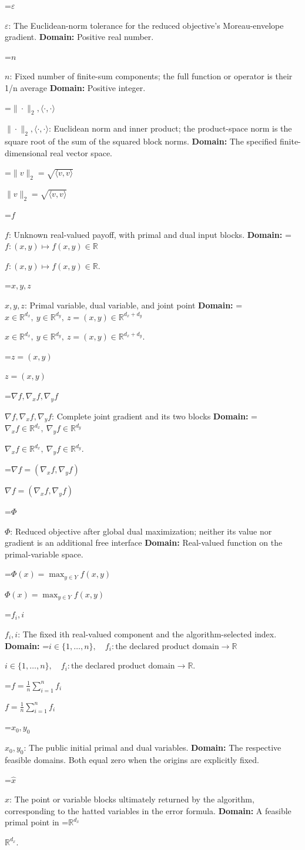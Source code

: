 \documentclass[10pt,a4paper]{article}
\newcommand{\AtlasMath}[1]{\par\begingroup\centering\setbox0=\hbox{$\displaystyle #1$}\ifdim\wd0>1.4\linewidth\typeout{ATLAS WIDE FORMULA: \the\wd0}\fi\ifdim\wd0>\linewidth\resizebox{\linewidth}{!}{\box0}\else\box0\fi\par\endgroup}
\newcommand{\AtlasInlineMath}[1]{\begingroup\setbox0=\hbox{$#1$}\ifdim\wd0>.4\linewidth\endgroup\AtlasMath{#1}\else\endgroup$#1$\fi}
\begin{document}
\AtlasInlineMath{\varepsilon}: The Euclidean-norm tolerance for the reduced objective’s Moreau-envelope gradient. \textbf{Domain:} Positive real number.

\AtlasInlineMath{n}: Fixed number of finite-sum components; the full function or operator is their 1/n average \textbf{Domain:} Positive integer.

\AtlasInlineMath{\|\cdot\|_2,\langle\cdot,\cdot\rangle}: Euclidean norm and inner product; the product-space norm is the square root of the sum of the squared block norms. \textbf{Domain:} The specified finite-dimensional real vector space.

\AtlasInlineMath{\|v\|_2=\sqrt{\langle v,v\rangle}}

\AtlasInlineMath{f}: Unknown real-valued payoff, with primal and dual input blocks. \textbf{Domain:} \AtlasInlineMath{f:(x,y)\mapsto f(x,y)\in\mathbb R}.

\AtlasInlineMath{x,y,z}: Primal variable, dual variable, and joint point \textbf{Domain:} \AtlasInlineMath{x\in\mathbb R^{d_x},\ y\in\mathbb R^{d_y},\ z=(x,y)\in\mathbb R^{d_x+d_y}}.

\AtlasInlineMath{z=(x,y)}

\AtlasInlineMath{\nabla f,\nabla_x f,\nabla_y f}: Complete joint gradient and its two blocks \textbf{Domain:} \AtlasInlineMath{\nabla_x f\in\mathbb R^{d_x},\ \nabla_y f\in\mathbb R^{d_y}}.

\AtlasInlineMath{\nabla f=(\nabla_x f,\nabla_y f)}

\AtlasInlineMath{\Phi}: Reduced objective after global dual maximization; neither its value nor gradient is an additional free interface \textbf{Domain:} Real-valued function on the primal-variable space.

\AtlasInlineMath{\Phi(x)=\max_{y\in Y}f(x,y)}

\AtlasInlineMath{f_i,i}: The fixed ith real-valued component and the algorithm-selected index. \textbf{Domain:} \AtlasInlineMath{i\in\{1,\ldots,n\},\quad f_i:\text{the declared product domain}\to\mathbb R}.

\AtlasInlineMath{f=\frac1n\sum_{i=1}^n f_i}

\AtlasInlineMath{x_0,y_0}: The public initial primal and dual variables. \textbf{Domain:} The respective feasible domains. Both equal zero when the origins are explicitly fixed.

\AtlasInlineMath{\widehat x}: The point or variable blocks ultimately returned by the algorithm, corresponding to the hatted variables in the error formula. \textbf{Domain:} A feasible primal point in \AtlasInlineMath{\mathbb R^{d_x}}.
\end{document}

